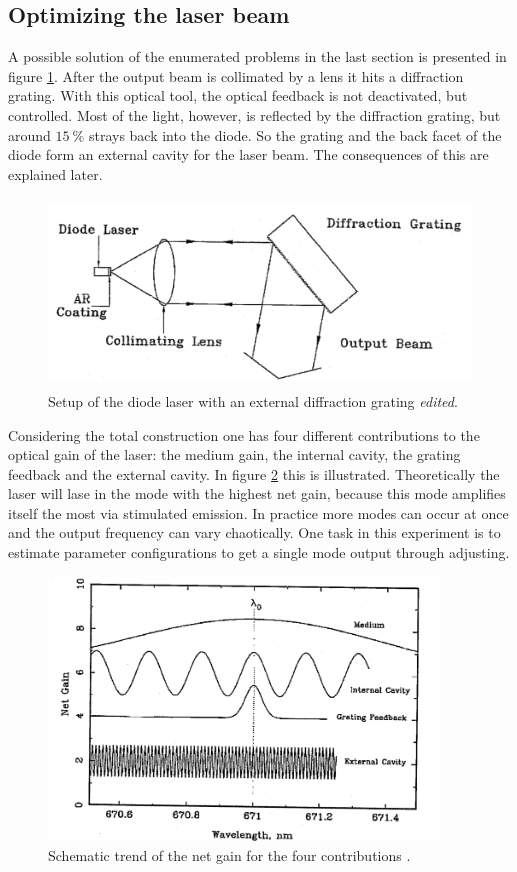 \subsection{Optimizing the laser beam}

A possible solution of the enumerated problems in the last section is presented in figure \ref{fig:diffraction}.
After the output beam is collimated by a lens it hits a diffraction grating. With this optical tool, the optical
feedback is not deactivated, but controlled. Most of the light, however, is reflected by the diffraction grating,
but around $\SI{15}{\percent}$ strays back into the diode. So the grating and the back facet of the diode form
an external cavity for the laser beam. The consequences of this are explained later.

\begin{figure}
  \centering
  \includegraphics[height=5cm]{Ordnername/diffraction_edit.pdf}
  \caption{Setup of the diode laser with an external diffraction grating \cite{manual} \textit{edited}.}
  \label{fig:diffraction}
\end{figure}

Considering the total construction one has four different contributions to the optical gain of the laser:
the medium gain, the internal cavity, the grating feedback and the external cavity.
In figure \ref{fig:optgain} this is illustrated. Theoretically the laser will lase in the mode with the
highest net gain, because this mode amplifies itself the most via stimulated emission. In practice more
modes can occur at once and the output frequency can vary chaotically. One task in this experiment is to
estimate parameter configurations to get a single mode output through adjusting.

\begin{figure}
  \centering
  \includegraphics[height=7cm]{Ordnername/optgain.png}
  \caption{Schematic trend of the net gain for the four contributions \cite{manual}.}
  \label{fig:optgain}
\end{figure}

